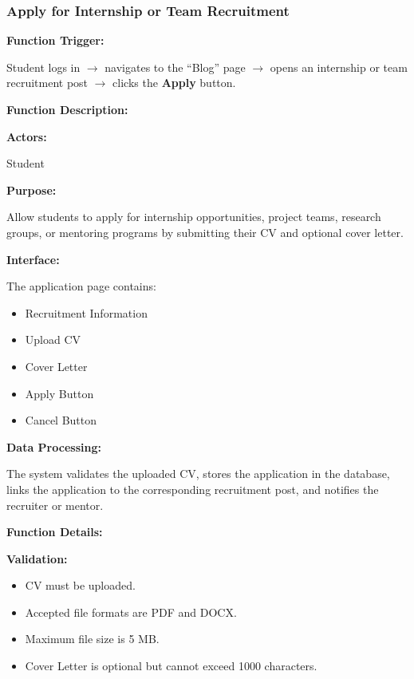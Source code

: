 \subsubsection{Apply for Internship or Team Recruitment}

\textbf{Function Trigger:}

Student logs in $\rightarrow$ navigates to the ``Blog'' page $\rightarrow$ opens an internship or team recruitment post $\rightarrow$ clicks the \textbf{Apply} button.

\vspace{0.3cm}

\textbf{Function Description:}

\textbf{Actors:}

Student

\vspace{0.2cm}

\textbf{Purpose:}

Allow students to apply for internship opportunities, project teams, research groups, or mentoring programs by submitting their CV and optional cover letter.

\vspace{0.2cm}

\textbf{Interface:}

The application page contains:

\begin{itemize}
    \item Recruitment Information
    \item Upload CV
    \item Cover Letter
    \item Apply Button
    \item Cancel Button
\end{itemize}

\vspace{0.2cm}

\textbf{Data Processing:}

The system validates the uploaded CV, stores the application in the database, links the application to the corresponding recruitment post, and notifies the recruiter or mentor.

\vspace{0.3cm}

\textbf{Function Details:}

\textbf{Validation:}

\begin{itemize}
    \item CV must be uploaded.
    \item Accepted file formats are PDF and DOCX.
    \item Maximum file size is 5 MB.
    \item Cover Letter is optional but cannot exceed 1000 characters.
\end{itemize}

